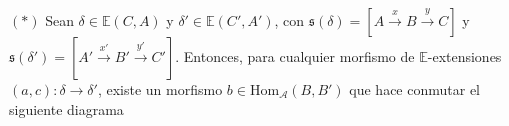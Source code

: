 \documentclass[preview]{standalone}
\begin{document}
\begin{center}
\justifying $(\ast)$ Sean $\delta\in\mathbb{E}(C,A)$ y $\delta'\in\mathbb{E}(C',A')$, con $\mathfrak{s}(\delta) = $$[A\xrightarrow{x} B\xrightarrow{y} C]$ y $\mathfrak{s}(\delta') = [A'\xrightarrow{x'} B'\xrightarrow{y'} C']$. Entonces, para cualquier morfismo de $\mathbb{E}$-extensiones $(a,c):\delta\to\delta'$, existe un morfismo $b\in\text{Hom}_\mathscr{A}(B,B')$ que hace conmutar el siguiente diagrama
\end{center}
\end{document}
